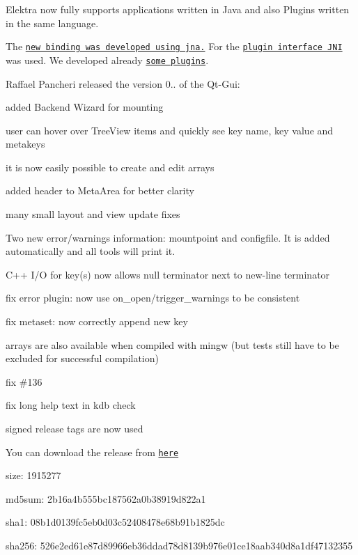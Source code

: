 Elektra now fully supports applications written in Java and also Plugins written in the same language.

The \href{https://github.com/ElektraInitiative/libelektra/tree/master/src/bindings/jna}{\tt new binding was developed using jna.} For the \href{https://github.com/ElektraInitiative/libelektra/tree/master/src/plugins/jni}{\tt plugin interface J\+NI} was used. We developed already \href{https://master.libelektra.org/src/bindings/jna/libelektra5j/src/main/java/org/libelektra/plugin}{\tt some plugins}.

Raffael Pancheri released the version 0.. of the Qt-\/\+Gui\+:


\begin{DoxyItemize}
\item added Backend Wizard for mounting
\item user can hover over Tree\+View items and quickly see key name, key value and metakeys
\item it is now easily possible to create and edit arrays
\item added header to Meta\+Area for better clarity
\item many small layout and view update fixes
\end{DoxyItemize}


\begin{DoxyItemize}
\item Two new error/warnings information\+: mountpoint and configfile. It is added automatically and all tools will print it.
\item C++ I/O for key(s) now allows null terminator next to new-\/line terminator
\item fix error plugin\+: now use {\ttfamily on\+\_\+open}/{\ttfamily trigger\+\_\+warnings} to be consistent
\item fix metaset\+: now correctly append new key
\item arrays are also available when compiled with mingw (but tests still have to be excluded for successful compilation)
\item fix \#136
\item fix long help text in {\ttfamily kdb check}
\item signed release tags are now used
\end{DoxyItemize}

You can download the release from \href{http://www.markus-raab.org/ftp/elektra/releases/elektra-0.8.10.tar.gz}{\tt here}


\begin{DoxyItemize}
\item size\+: 1915277
\item md5sum\+: 2b16a4b555bc187562a0b38919d822a1
\item sha1\+: 08b1d0139fc5eb0d03c52408478e68b91b1825dc
\item sha256\+: 526e2ed61e87d89966eb36ddad78d8139b976e01ce18aab340d8a1df47132355
\end{DoxyItemize}

